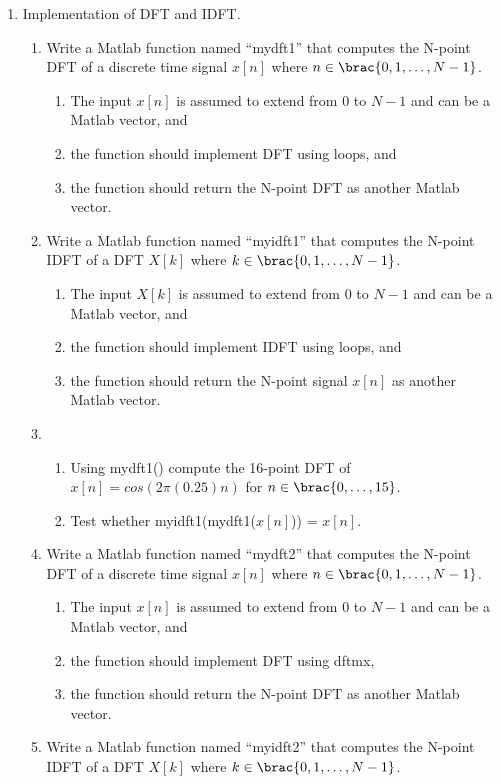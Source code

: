 \begin{enumerate}
\item Implementation of DFT and IDFT.
  \begin{enumerate}
  \item Write a Matlab function named ``mydft1'' that computes the N-point DFT of a discrete time signal $x[n]$ where $n \in \brac{0,1,\dots, N - 1}$.
    \begin{enumerate}
    \item The input $x[n]$ is assumed to extend from $0$ to $N - 1$ and can be a Matlab vector, and 
    \item the function should implement DFT using loops, and 
    \item the function should return the N-point DFT as another Matlab vector.
    \end{enumerate}
  \item Write a Matlab function named ``myidft1'' that computes the N-point IDFT of a DFT $X[k]$ where $k \in \brac{0,1,\dots, N - 1}$.
    \begin{enumerate}
    \item The input $X[k]$ is assumed to extend from $0$ to $N - 1$ and can be a Matlab vector, and 
    \item the function should implement IDFT using loops, and 
    \item the function should return the N-point signal $x[n]$ as another Matlab vector.
    \end{enumerate}
  \item 
    \begin{enumerate}
    \item Using mydft1() compute the 16-point DFT of $x[n] = cos(2\pi (0.25)n)$ for $n \in \brac{0, \dots, 15}$.
    \item Test whether myidft1(mydft1($x[n]$)) = $x[n]$.
    \end{enumerate}
  \item Write a Matlab function named ``mydft2'' that computes the N-point DFT of a discrete time signal $x[n]$ where $n \in \brac{0,1,\dots, N - 1}$.
    \begin{enumerate}
    \item The input $x[n]$ is assumed to extend from $0$ to $N - 1$ and can be a Matlab vector, and 
    \item the function should implement DFT using dftmx,
    \item the function should return the N-point DFT as another Matlab vector.
    \end{enumerate}
  \item Write a Matlab function named ``myidft2'' that computes the N-point IDFT of a DFT $X[k]$ where $k \in \brac{0,1,\dots, N - 1}$.

\end{enumerate}
\end{enumerate}
